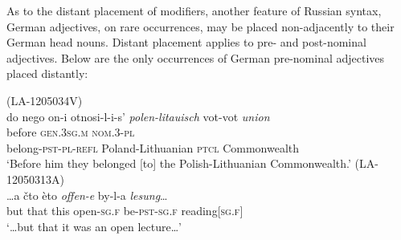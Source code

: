As to the distant placement of modifiers, another feature of Russian syntax, German adjectives, on rare occurrences, may be placed non-adjacently to their German head nouns. Distant placement applies to pre- and post-nominal adjectives. Below are the only occurrences of German pre-nominal adjectives placed distantly: 

\ea
\label{ex:4:31}
(LA-1205034V)\\
\gll do nego on-i otnosi-l-i-s’ \textit{polen-litauisch}  vot-vot \textit{union} \\
	before \textsc{gen.3sg.m} \textsc{nom.3-pl}\\ belong-\textsc{pst-pl-refl} Poland-Lithuanian \textsc{ptcl} Commonwealth\\
\glt `Before him they belonged [to] the Polish-Lithuanian Commonwealth.'
\ex
\label{ex:4:32}
(LA-12050313A)\\
\gll \dots a čto èto \textit{offen-e}  by-l-a \textit{lesung}\dots \\
	but that this open-\textsc{sg.f} be-\textsc{pst-sg.f} reading[\textsc{sg.f}]\\
\glt `\dots{but} that it was an open lecture\dots'
\z

